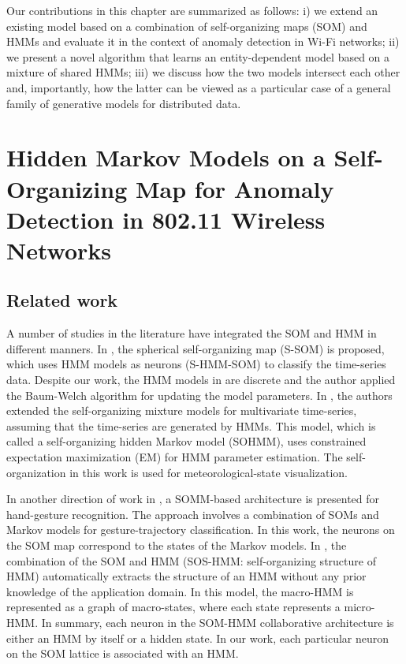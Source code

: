 Our contributions in this chapter are summarized as follows: i) we extend an existing model based on a combination of self-organizing maps (SOM) and HMMs and evaluate it in the context of anomaly detection in Wi-Fi networks; ii) we present a novel algorithm that learns an entity-dependent model based on a mixture of shared HMMs; iii) we discuss how the two models intersect each other and, importantly, how the latter can be viewed as a particular case of a general family of generative models for distributed data.

\section{Hidden Markov Models on a Self-Organizing Map for Anomaly Detection in 802.11 Wireless Networks}
\label{sec:sohmmm}

\subsection{Related work}
A number of studies in the literature have integrated the SOM and HMM in different manners. In \citet{Ref15}, the spherical self-organizing map (S-SOM) is proposed, which uses HMM models as neurons (S-HMM-SOM) to classify the time-series data. Despite our work, the HMM models in \citet{Ref15} are discrete and the author applied the  Baum-Welch algorithm for updating the model parameters. In \citet{Ref16}, the authors extended the self-organizing mixture models for multivariate time-series, assuming that the time-series are generated by HMMs. This model, which is called a self-organizing hidden Markov model (SOHMM), uses constrained expectation maximization (EM) for HMM parameter estimation. The self-organization in this work is used for meteorological-state visualization. 

In another direction of work in \citet{Ref21}, a SOMM-based architecture is presented for hand-gesture recognition. The approach involves a combination of SOMs and Markov models for gesture-trajectory classification. In this work, the neurons on the SOM map correspond to the states of the Markov models. In \citet{Ref24}, the combination of the SOM and HMM (SOS-HMM: self-organizing structure of HMM) automatically extracts the structure of an HMM without any prior knowledge of the application domain. In this model, the macro-HMM is represented as a graph of macro-states, where each state represents a micro-HMM. In summary, each neuron in the SOM-HMM collaborative architecture is either an HMM by itself or a hidden state. In our work, each particular neuron on the SOM lattice is associated with an HMM. 


